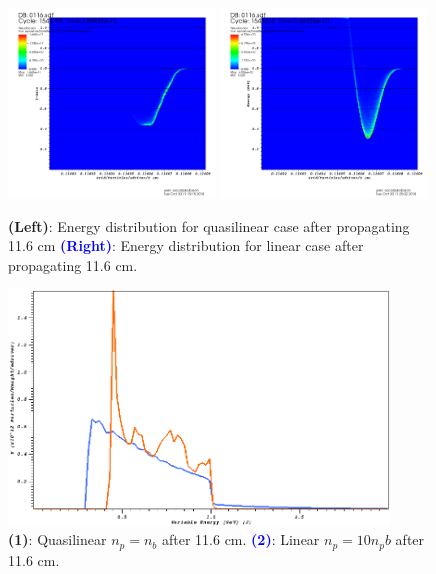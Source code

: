 \documentclass[%
onecolumn, notitlepage,
 amsmath,amssymb,
 aps,
]{article}
\begin{document}
\clearpage
\begin{figure}[!ht]
\centering
\includegraphics[width=0.49\textwidth]{visit0016.png}
\includegraphics[width=0.49\textwidth]{visit0012.png}
\caption{\textcolor{Orange2}{\textbf{(Left)}}{: Energy distribution for quasilinear case after propagating 11.6 cm} \textcolor{blue}{\textbf{(Right)}}{: Energy distribution for linear case after propagating 11.6 cm.}}
\end{figure}
\begin{figure}[!ht]
\centering
\includegraphics[width=0.9\textwidth]{visit0019.png}
\caption{\textcolor{Orange2}{\textbf{(1)}}{: Quasilinear $n_p=n_b$ after 11.6 cm.} \textcolor{blue}{\textbf{(2)}}{: Linear $n_p=10n_pb$ after 11.6 cm.}}
\end{figure}
\end{document}
